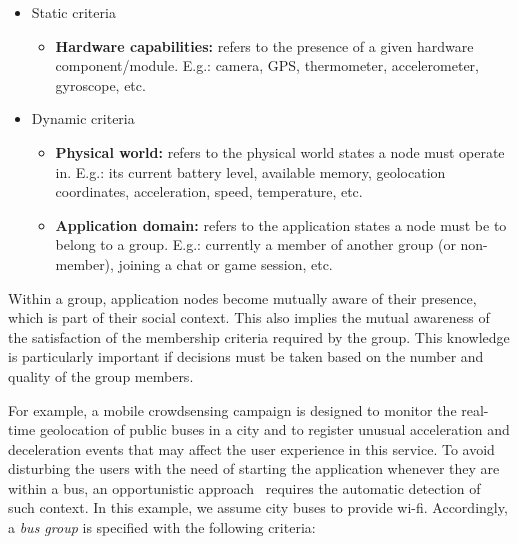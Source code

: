 \begin{itemize}
	
	\item Static criteria
	
	\begin{itemize}
		
		\item \textbf{Hardware capabilities:} refers to the presence of a given hardware component/module. E.g.: camera, GPS, thermometer, accelerometer, gyroscope, etc.
		
	\end{itemize}
	
	\item Dynamic criteria
	
	\begin{itemize}
		
		\item \textbf{Physical world:} refers to the physical world states a node must operate in. E.g.: its current battery level, available memory, geolocation coordinates, acceleration, speed, temperature, etc.
		
		\item \textbf{Application domain:} refers to the application states a node must be to belong to a group. E.g.: currently a member of another group (or non-member), joining a chat or game session, etc.
		
	\end{itemize}
	
\end{itemize}

Within a group, application nodes become mutually aware of their presence, which is part of their social context. This also implies the mutual awareness of the satisfaction of the membership criteria required by the group. This knowledge is particularly important if decisions must be taken based on the number and quality of the group members. 

For example, a mobile crowdsensing campaign is designed to monitor the real-time geolocation of public buses in a city and to register unusual acceleration and deceleration events that may affect the user experience in this service. To avoid disturbing the users with the need of starting the application whenever they are within a bus, an opportunistic approach~\cite{} requires the automatic detection of such context. In this example, we assume city buses to provide wi-fi. Accordingly, a \textit{bus group} is specified with the following criteria:

